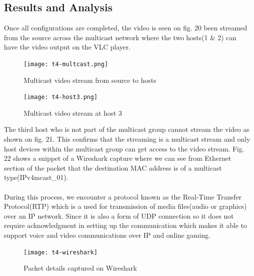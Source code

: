 \documentclass{article}
\begin{document}
\subsection{Results and Analysis}
Once all configurations are completed, the video is seen on fig. 20 been streamed from the source across the multicast network where the two hosts(1 \& 2) can have the video output on the VLC player.
	\begin{figure}[h]
		\centering
		\texttt{[image: t4-multcast.png]}
		\caption{Multicast video stream from source to hosts}
		\label{fig:t4-4}
	\end{figure}
	\begin{figure}[h]
		\centering
		\texttt{[image: t4-host3.png]}
		\caption{Multicast video stream at host 3}
		\label{fig:t4-5}
	\end{figure}
\par The third host who is not part of the multicast group cannot stream the video as shown on fig. 21. This confirms that the streaming is a multicast stream and only host devices within the multicast group can get access to the video stream. Fig. 22 shows a snippet of a Wireshark capture where we can see from Ethernet section of the packet that the destination MAC address is of a multicast type(IPv4mcast\_01). \\\\ During this process, we encounter a protocol known as the Real-Time Transfer Protocol(RTP) which is a used for transmission of media files(audio or graphics) over an IP network. Since it is also a form of UDP connection so it does not require acknowledgment in setting up the communication which makes it able to support voice and video communications over IP and online gaming.

\newpage
	\begin{figure}[h]
		\centering
		\texttt{[image: t4-wireshark]}
		\caption{Packet details captured on Wireshark}
		\label{fig:t4-6}
	\end{figure}
	
\end{document}
